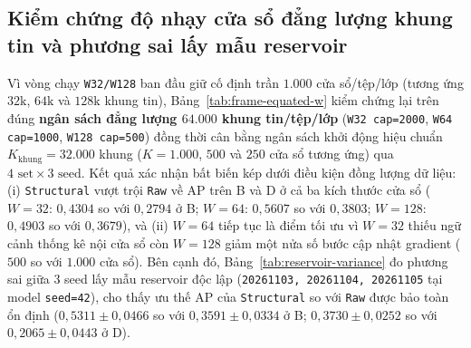 \documentclass[12pt, a4paper, reqno, oneside]{book}
\DeclareRobustCommand{\code}[1]{\nolinkurl{#1}}
\begin{document}
{\subsection{Kiểm chứng độ nhạy cửa sổ đẳng lượng khung tin và phương sai lấy mẫu reservoir}\label{subsec:frame-equated-w-and-reservoir}
Vì vòng chạy \code{W32/W128} ban đầu giữ cố định trần $1.000$ cửa sổ/tệp/lớp (tương ứng $32\text{k}$, $64\text{k}$ và $128\text{k}$ khung tin), Bảng~\ref{tab:frame-equated-w} kiểm chứng lại trên đúng \textbf{ngân sách đẳng lượng $64.000$ khung tin/tệp/lớp} (\code{W32 cap=2000}, \code{W64 cap=1000}, \code{W128 cap=500}) đồng thời cân bằng ngân sách khởi động hiệu chuẩn $K_{\text{khung}}=32.000$ khung ($K=1.000$, $500$ và $250$ cửa sổ tương ứng) qua $4\text{ set} \times 3\text{ seed}$. Kết quả xác nhận bất biến kép dưới điều kiện đồng lượng dữ liệu: (i) \code{Structural} vượt trội \code{Raw} về AP trên B và D ở cả ba kích thước cửa sổ ($W=32$: $0{,}4304$ so với $0{,}2794$ ở B; $W=64$: $0{,}5607$ so với $0{,}3803$; $W=128$: $0{,}4903$ so với $0{,}3679$), và (ii) $W=64$ tiếp tục là điểm tối ưu vì $W=32$ thiếu ngữ cảnh thống kê nội cửa sổ còn $W=128$ giảm một nửa số bước cập nhật gradient ($500$ so với $1.000$ cửa sổ). Bên cạnh đó, Bảng~\ref{tab:reservoir-variance} đo phương sai giữa 3 seed lấy mẫu reservoir độc lập (\code{20261103, 20261104, 20261105} tại model \code{seed=42}), cho thấy ưu thế AP của \code{Structural} so với \code{Raw} được bảo toàn ổn định ($0{,}5311 \pm 0{,}0466$ so với $0{,}3591 \pm 0{,}0334$ ở B; $0{,}3730 \pm 0{,}0252$ so với $0{,}2065 \pm 0{,}0443$ ở D).

}
\end{document}

